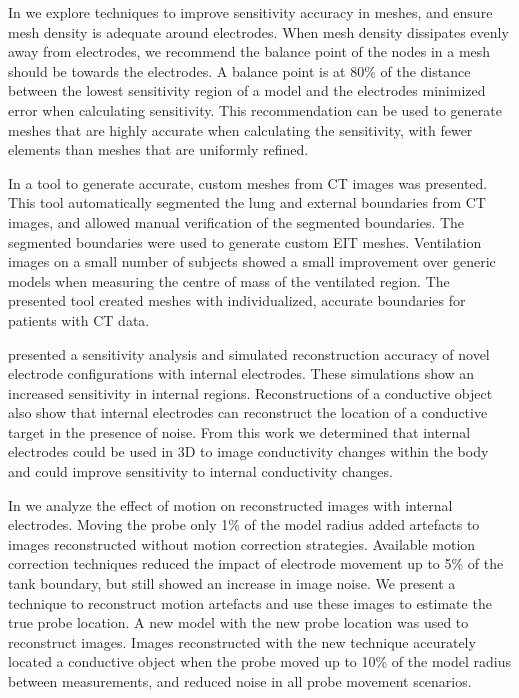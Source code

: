 
In  we explore techniques to
improve sensitivity accuracy in meshes, and ensure mesh density is adequate 
around electrodes. 
When mesh density dissipates evenly away from electrodes, we recommend 
the balance point 
of the nodes in a mesh should be towards the electrodes. 
A balance point is 
at 80\% of the distance between the lowest sensitivity region of a 
model and the electrodes minimized error when calculating sensitivity. 
This recommendation can be used to generate 
meshes that are highly accurate when calculating the sensitivity, with fewer elements
than meshes that are uniformly refined.  

In  a tool to generate accurate, custom meshes from 
CT images was presented. This tool automatically segmented the lung and external 
boundaries from CT images, and allowed manual verification of the segmented boundaries. 
The segmented boundaries were used to generate custom EIT meshes. 
Ventilation images on a small number of subjects 
showed a small improvement over generic models when 
measuring the centre of mass of the ventilated region. The presented tool 
created meshes with individualized, accurate boundaries 
for patients with CT data.

 presented a sensitivity analysis and simulated 
reconstruction accuracy of novel electrode configurations with internal electrodes. 
These simulations show an increased sensitivity in internal regions. Reconstructions 
of a conductive object also show that internal electrodes can reconstruct 
the location of a conductive target in the presence of noise. From this work 
we determined that internal electrodes could be used in 3D to image conductivity changes 
within the body and could improve sensitivity to internal conductivity changes. 

In  we analyze the effect of motion on reconstructed images with 
internal electrodes. Moving the probe only 1\% of the model radius added artefacts
to images reconstructed without motion correction strategies. 
Available motion correction techniques reduced the impact of 
electrode movement up to 5\% of the tank boundary, but still showed an increase in 
image noise. 
We present a technique to reconstruct motion artefacts and use these images to 
estimate the true probe location. A new model with the new probe location 
was used to reconstruct images. Images reconstructed with the new technique
accurately located a conductive object when the probe moved up to 
10\% of the model radius between measurements, 
and reduced noise in all probe movement scenarios. 

